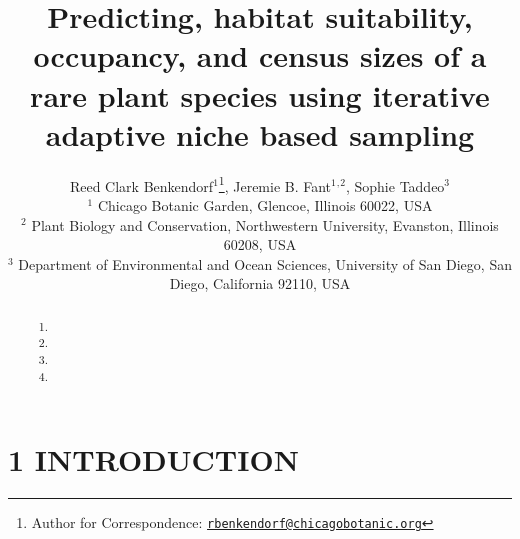\documentclass[
]{article}
\title{Predicting, habitat suitability, occupancy, and census sizes of a
rare plant species using iterative adaptive niche based sampling}
\author{Reed Clark Benkendorf\(^1\)\footnote{Author for Correspondence:
  \href{mailto:rbenkendorf@chicagobotanic.org}{\nolinkurl{rbenkendorf@chicagobotanic.org}}},
Jeremie B. Fant\(^1\)\(^,\)\(^2\), Sophie Taddeo\(^3\)\\
\hspace*{0.333em}\(^1\) Chicago Botanic Garden, Glencoe, Illinois 60022,
USA\\
\hspace*{0.333em}\(^2\) Plant Biology and Conservation, Northwestern
University, Evanston, Illinois 60208, USA\\
\hspace*{0.333em}\(^3\) Department of Environmental and Ocean Sciences,
University of San Diego, San Diego, California 92110, USA}
\date{}
\providecommand{\tightlist}{%
  \setlength{\itemsep}{0pt}\setlength{\parskip}{0pt}}
\begin{document}
\maketitle
\begin{abstract}
\begin{enumerate}
\def\labelenumi{\arabic{enumi})}
\tightlist
\item
\item
\item
\item
\end{enumerate}
\end{abstract}

\hypertarget{introduction}{%
\section{1 \textbar{} INTRODUCTION}\label{introduction}}
\end{document}
